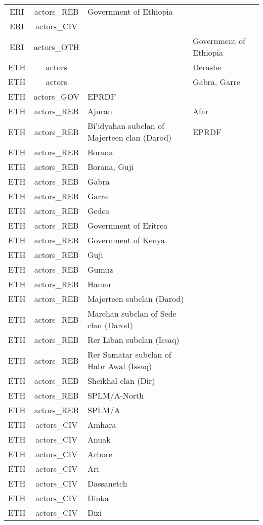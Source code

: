 \documentclass[12pt]{article}
\begin{document}
\begin{center}
\begin{longtable}{|c|c|p{7cm}|p{7cm}|}
  ERI & actors\_REB & Government of Ethiopia &  \\ 
  ERI & actors\_CIV &  &  \\ 
  ERI & actors\_OTH &  & Government of Ethiopia \\ 
  ETH & actors &  & Derashe \\ 
  ETH & actors &  & Gabra, Garre \\ 
  ETH & actors\_GOV & EPRDF &  \\ 
  ETH & actors\_REB & Ajuran & Afar \\ 
  ETH & actors\_REB & Bi'idyahan subclan of Majerteen clan (Darod) & EPRDF \\ 
  ETH & actors\_REB & Borana &  \\ 
  ETH & actors\_REB & Borana, Guji &  \\ 
  ETH & actors\_REB & Gabra &  \\ 
  ETH & actors\_REB & Garre &  \\ 
  ETH & actors\_REB & Gedeo &  \\ 
  ETH & actors\_REB & Government of Eritrea &  \\ 
  ETH & actors\_REB & Government of Kenya &  \\ 
  ETH & actors\_REB & Guji &  \\ 
  ETH & actors\_REB & Gumuz &  \\ 
  ETH & actors\_REB & Hamar &  \\ 
  ETH & actors\_REB & Majerteen subclan (Darod) &  \\ 
  ETH & actors\_REB & Marehan subclan of Sede clan (Darod) &  \\ 
  ETH & actors\_REB & Rer Liban subclan (Issaq) &  \\ 
  ETH & actors\_REB & Rer Samatar subclan of Habr Awal (Issaq) &  \\ 
  ETH & actors\_REB & Sheikhal clan (Dir) &  \\ 
  ETH & actors\_REB & SPLM/A-North &  \\ 
  ETH & actors\_REB & SPLM/A &  \\ 
  ETH & actors\_CIV & Amhara &  \\ 
  ETH & actors\_CIV & Anuak &  \\ 
  ETH & actors\_CIV & Arbore &  \\ 
  ETH & actors\_CIV & Ari &  \\ 
  ETH & actors\_CIV & Dassanetch &  \\ 
  ETH & actors\_CIV & Dinka &  \\ 
  ETH & actors\_CIV & Dizi &  \\ 

\end{longtable}
\end{center}
\end{document}
